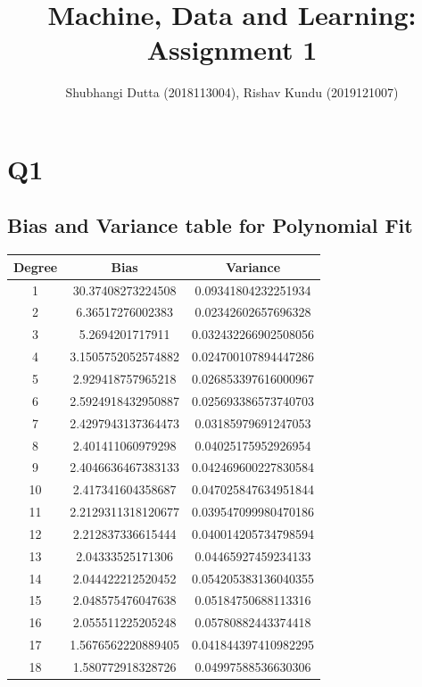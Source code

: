 \documentclass{article}
\begin{document}
\title{Machine, Data and Learning: Assignment 1}
\author{Shubhangi Dutta (2018113004), Rishav Kundu (2019121007)}
\maketitle
\newpage
\section{Q1}
\subsection{Bias and Variance table for Polynomial Fit}

\begin{center}
\begin{tabular}{ | c | c | c | }
\hline
Degree & Bias & Variance \\ 
\hline \hline
1 & 30.37408273224508 & 0.09341804232251934 \\ 
\hline
2 & 6.36517276002383 & 0.02342602657696328 \\ 
\hline
3 & 5.2694201717911 & 0.032432266902508056 \\ 
\hline
4 & 3.1505752052574882 & 0.024700107894447286 \\ 
\hline
5 & 2.929418757965218 & 0.026853397616000967 \\ 
\hline
6 & 2.5924918432950887 & 0.025693386573740703 \\ 
\hline
7 & 2.4297943137364473 & 0.03185979691247053 \\ 
\hline
8 & 2.401411060979298 & 0.04025175952926954 \\ 
\hline
9 & 2.4046636467383133 & 0.042469600227830584 \\ 
\hline
10 & 2.417341604358687 & 0.047025847634951844 \\ 
\hline
11 & 2.2129311318120677 & 0.039547099980470186 \\ 
\hline
12 & 2.212837336615444 & 0.040014205734798594 \\ 
\hline
13 & 2.04333525171306 & 0.04465927459234133 \\ 
\hline
14 & 2.044422212520452 & 0.054205383136040355 \\ 
\hline
15 & 2.048575476047638 & 0.05184750688113316 \\ 
\hline
16 & 2.055511225205248 & 0.05780882443374418 \\ 
\hline
17 & 1.5676562220889405 & 0.041844397410982295 \\ 
\hline
18 & 1.580772918328726 & 0.04997588536630306 \\ 

\end{tabular}
\end{center}
\end{document}
